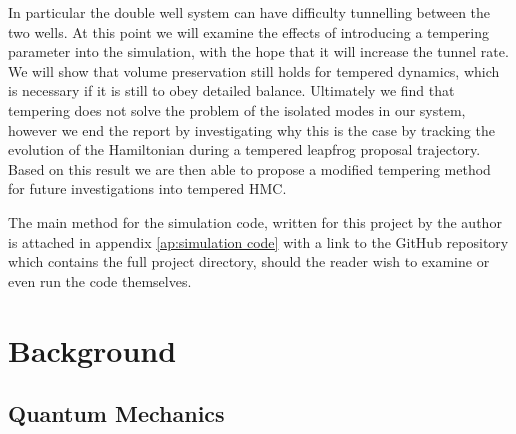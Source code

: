 \documentclass[12pt]{article}
\begin{document}
In particular the double well system can have difficulty tunnelling between the two wells. At this point we will examine the effects of introducing a tempering parameter into the simulation, with the hope that it will increase the tunnel rate. We will show that volume preservation still holds for tempered dynamics, which is necessary if it is still to obey detailed balance. Ultimately we find that tempering does not solve the problem of the isolated modes in our system, however we end the report by investigating why this is the case by tracking the evolution of the Hamiltonian during a tempered leapfrog proposal trajectory. Based on this result we are then able to propose a modified tempering method for future investigations into tempered HMC.

 The main method for the simulation code, written for this project by the author is attached in appendix \ref{ap:simulation code} with a link to the GitHub repository which contains the full project directory, should the reader wish to examine or even run the code themselves.


\section{Background}
    \subsection{Quantum Mechanics}
\end{document}
